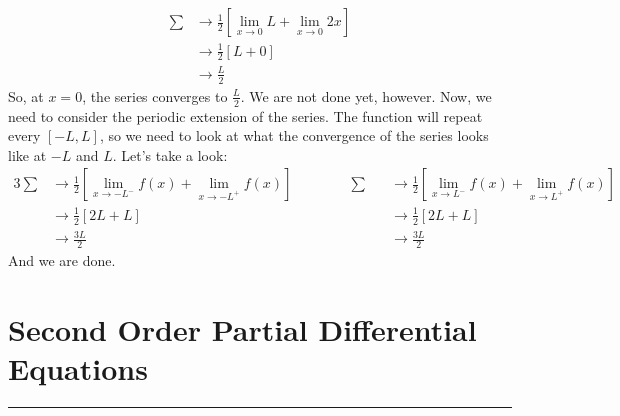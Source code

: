 \documentclass{article}
\begin{document}
\begin{align*}
\sum &\to \frac{1}{2}\left[\lim_{x\to 0}L + \lim_{x\to0}2x\right]\\
&\to \frac{1}{2}[L + 0]\\
&\to \frac{L}{2}
\end{align*}
\noindent So, at $x=0$, the series converges to $\frac{L}{2}$. We are not done yet, however. Now, we need to consider the periodic extension of the series. The function will repeat every $[-L,L]$, so we need to look at what the convergence of the series looks like at $-L$ and $L$. Let's take a look:
\begin{alignat*}{3}
\sum&\to\frac{1}{2}\left[\lim_{x\to-L^{-}}f(x) + \lim_{x\to-L^{+}}f(x)\right] \qquad\qquad \sum&&\to \frac{1}{2}\left[\lim_{x\to L^{-}}f(x) + \lim_{x\to L^{+}}f(x)\right]\\
&\to \frac{1}{2}[2L + L] &&\to \frac{1}{2}[2L + L]\\
&\to\frac{3L}{2} &&\to\frac{3L}{2}
\end{alignat*}
\noindent And we are done.
\newpage

\section{Second Order Partial Differential Equations}
\hrule
\noindent\\
\end{document}

